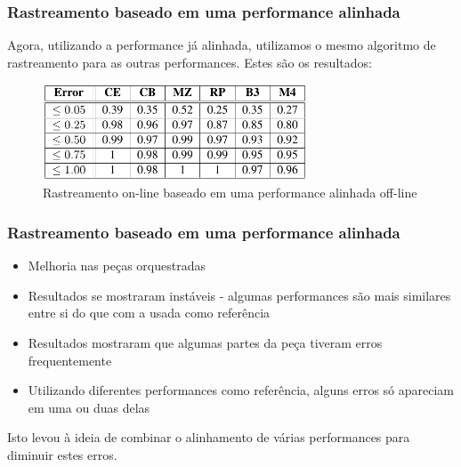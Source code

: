 \begin{frame}
  \frametitle{Rastreamento baseado em uma performance alinhada}
  Agora, utilizando a performance já alinhada, utilizamos o mesmo algoritmo de rastreamento para as outras performances.
  Estes são os resultados:
  \begin{figure}[!ht]
    \centering
    \includegraphics[width=0.7\textwidth]{src/img/3-Table4-1.png}
    \caption*{Rastreamento on-line baseado em uma performance alinhada off-line}
  \end{figure}
\end{frame}

\begin{frame}
  \frametitle{Rastreamento baseado em uma performance alinhada}
  \begin{itemize}
    \item Melhoria nas peças orquestradas\pause
    \item Resultados se mostraram instáveis - algumas performances são mais similares entre si do que com a usada como referência \pause %
    \item Resultados mostraram que algumas partes da peça tiveram erros frequentemente \pause %
    \item Utilizando diferentes performances como referência, alguns erros só apareciam em uma ou duas delas \pause
  \end{itemize}
  Isto levou à ideia de combinar o alinhamento de várias performances para diminuir estes erros.
\end{frame}

